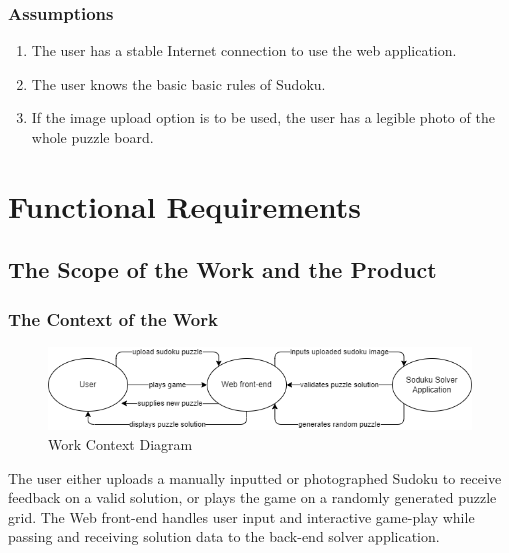 \documentclass[11pt]{article}
\begin{document}
\subsubsection{Assumptions}

\begin{enumerate}
    \item The user has a stable Internet connection to use the web application.
    \item The user knows the basic basic rules of Sudoku.
    \item If the image upload option is to be used, the user has a legible photo of the whole puzzle board.
\end{enumerate}

\section{Functional Requirements}

\subsection{The Scope of the Work and the Product}

\subsubsection{The Context of the Work}
\begin{figure}[H]
    \centering
    \includegraphics[width=\textwidth]{sudoku_scope}
    \caption{Work Context Diagram}
    \label{fig:my_label}
\end{figure}

The user either uploads a manually inputted or photographed Sudoku to receive feedback on a valid solution, or plays the game on a randomly generated puzzle grid. The Web front-end handles user input and interactive game-play while passing and receiving solution data to the back-end solver application.
\end{document}
